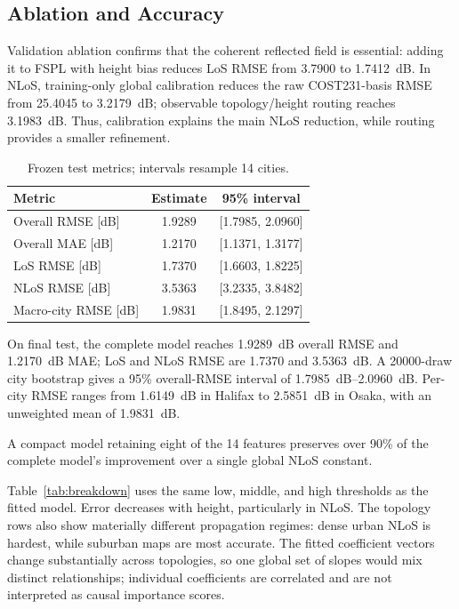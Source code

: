 \documentclass[10pt,conference,letterpaper]{IEEEtran}
\begin{document}
\subsection{Ablation and Accuracy}
Validation ablation confirms that the coherent reflected field is essential:
adding it to FSPL with height bias reduces LoS RMSE from 3.7900 to
\SI{1.7412}{dB}. In NLoS, training-only global calibration reduces the raw
COST231-basis RMSE from 25.4045 to \SI{3.2179}{dB}; observable topology/height
routing reaches \SI{3.1983}{dB}. Thus, calibration explains the main NLoS
reduction, while routing provides a smaller refinement.

\begin{table}[t]
\centering
\caption{Frozen test metrics; intervals resample 14 cities.}
\label{tab:main-results}
\scriptsize
\setlength{\tabcolsep}{4pt}
\begin{tabular}{lcc}
\toprule
Metric & Estimate & 95\% interval \\
\midrule
Overall RMSE [dB] & 1.9289 & [1.7985, 2.0960] \\
Overall MAE [dB] & 1.2170 & [1.1371, 1.3177] \\
LoS RMSE [dB] & 1.7370 & [1.6603, 1.8225] \\
NLoS RMSE [dB] & 3.5363 & [3.2335, 3.8482] \\
Macro-city RMSE [dB] & 1.9831 & [1.8495, 2.1297] \\
\bottomrule
\end{tabular}
\end{table}

On final test, the complete model reaches \SI{1.9289}{dB} overall RMSE and
\SI{1.2170}{dB} MAE; LoS and NLoS RMSE are 1.7370 and \SI{3.5363}{dB}.
A 20000-draw city bootstrap gives a 95\% overall-RMSE interval of
\SIrange{1.7985}{2.0960}{dB}. Per-city RMSE ranges from \SI{1.6149}{dB} in
Halifax to \SI{2.5851}{dB} in Osaka, with an unweighted mean of
\SI{1.9831}{dB}.

A compact model retaining eight of the 14 features preserves over 90\% of the
complete model's improvement over a single global NLoS constant.

Table~\ref{tab:breakdown} uses the same low, middle, and high thresholds as the
fitted model. Error decreases with height, particularly in NLoS. The topology
rows also show materially different propagation regimes: dense urban NLoS is
hardest, while suburban maps are most accurate. The fitted coefficient vectors
change substantially across topologies, so one global set of slopes would mix
distinct relationships; individual coefficients are correlated and are not
interpreted as causal importance scores.
\end{document}
